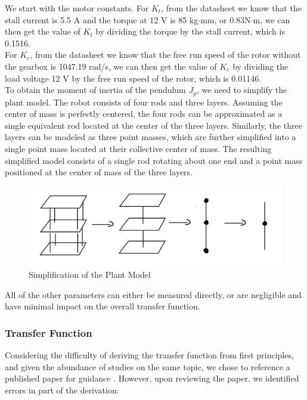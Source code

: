 \documentclass{article}
\begin{document}
We start with the motor constants. For $K_t$, from the datasheet we know
that the stall current is 5.5 A and the torque at 12 V is 85 kg$\cdot$mm, or
0.83N$\cdot$m, we can then get the value of $K_t$ by dividing the torque by the
stall current, which is 0.1516. \\

For $K_e$, from the datasheet we know that the free run speed of the rotor
without the gearbox is 1047.19 rad/s, we can then get the value of $K_e$ by
dividing the load voltage 12 V by the free run speed of the rotor, which is
0.01146. \\

To obtain the moment of inertia of the pendulum $J_p$, we need to simplify the
plant model. The robot consists of four rods and three layers. Assuming the
center of mass is perfectly centered, the four rods can be approximated as a
single equivalent rod located at the center of the three layers. Similarly, the
three layers can be modeled as three point masses, which are further simplified
into a single point mass located at their collective center of mass. The
resulting simplified model consists of a single rod rotating about one end and a
point mass positioned at the center of mass of the three layers. \\
\begin{figure}[H]
    \centerline{\includegraphics[width=\linewidth]{Figures/plantModelSimplification.png}}
    \caption{Simplification of the Plant Model}
\end{figure}

All of the other parameters can either be measured directly, or are negligible
and have minimal impact on the overall transfer function. \\

\subsubsection{Transfer Function}

Considering the difficulty of deriving the transfer function from first
principles, and given the abundance of studies on the same topic, we chose to
reference a published paper for guidance \cite{suspaper}. However, upon
reviewing the paper, we identified errors in part of the derivation: \\
\end{document}
